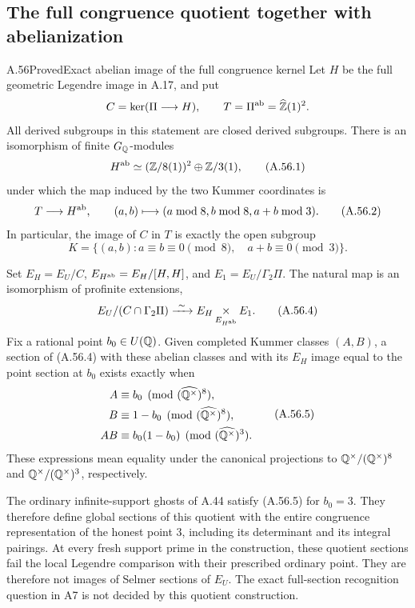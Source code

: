 \subsection{The full congruence quotient together with abelianization}

\begin{statement}{A.56}{Proved}{Exact abelian image of the full congruence kernel}
Let $H$ be the full geometric Legendre image in A.17, and put
\[
 C=\ker(\Pi\longrightarrow H),\qquad
 T=\Pi^{\rm ab}=\widehat{\mathbb Z}(1)^2.
\]
All derived subgroups in this statement are closed derived
subgroups.  There is an isomorphism of finite $G_\mathbb Q$-modules
\[
 H^{\rm ab}\simeq (\mathbb Z/8(1))^2\oplus\mathbb Z/3(1),
\tag{A.56.1}
\]
under which the map induced by the two Kummer coordinates is
\[
 T\longrightarrow H^{\rm ab},\qquad
          (a,b)\longmapsto(a\bmod8, b\bmod8, a+b\bmod3).
\tag{A.56.2}
\]
In particular, the image of $C$ in $T$ is exactly the open subgroup
\[
 K=\{(a,b):a\equiv b\equiv0\pmod8,\quad a+b\equiv0\pmod3\}.
\tag{A.56.3}
\]

Set $E_H=E_U/C$, $E_{H^{\rm ab}}=E_H/[H,H]$, and
$E_1=E_U/\Gamma_2\Pi$.  The natural map is an isomorphism of
profinite extensions,
\[
 E_U/(C\cap\Gamma_2\Pi)
       \xrightarrow{\ \sim\ }
       E_H\mathop{\times}_{E_{H^{\rm ab}}}E_1.
\tag{A.56.4}
\]
Fix a rational point $b_0\in U(\mathbb Q)$.  Given completed Kummer
classes $(A,B)$, a section of (A.56.4) with these abelian classes
and with its $E_H$ image equal to the point section at $b_0$
exists exactly when
\[
 \begin{split}
 A&\equiv b_0\pmod{(\widehat{\mathbb Q^\times})^8},\\
 B&\equiv1-b_0\pmod{(\widehat{\mathbb Q^\times})^8},\\
 AB&\equiv b_0(1-b_0)\pmod{(\widehat{\mathbb Q^\times})^3}.
 \end{split}
\tag{A.56.5}
\]
These expressions mean equality under the canonical projections
to $\mathbb Q^\times/(\mathbb Q^\times)^8$ and
$\mathbb Q^\times/(\mathbb Q^\times)^3$, respectively.

The ordinary infinite-support ghosts of A.44 satisfy (A.56.5)
for $b_0=3$.  They therefore define global sections of this
quotient with the entire congruence representation of the honest
point $3$, including its determinant and its integral pairings.
At every fresh support prime in the construction, these quotient
sections fail the local Legendre comparison with their prescribed
ordinary point.  They are therefore not images of Selmer sections
of $E_U$.  The exact full-section recognition question in A7 is
not decided by this quotient construction.
\end{statement}
